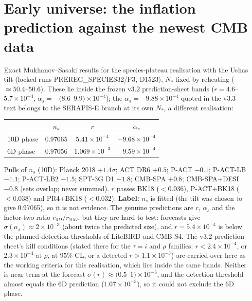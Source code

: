 \documentclass[11pt]{article}
\begin{document}
\section{Early universe: the inflation prediction against the newest CMB data}
Exact Mukhanov--Sasaki results for the species-plateau realisation with the Ushas tilt (locked runs PREREG\_SPECIES32/P3, D1523), $N_*$ fixed by reheating ($\simeq 50.4$--$50.6$). These lie inside the frozen v3.2 prediction-sheet bands ($r=4.6$--$5.7\times10^{-4}$, $\alpha_s=-(8.6$--$9.9)\times10^{-4}$); the $\alpha_s=-9.88\times10^{-4}$ quoted in the v3.3 text belongs to the SERAPIS-E branch at its own $N_*$, a different realisation:
\begin{center}\small
\begin{tabular}{lccc}\toprule
 & $n_s$ & $r$ & $\alpha_s$\\\midrule
10D phase & 0.97065 & $5.41\times10^{-4}$ & $-9.68\times10^{-4}$\\
6D phase & 0.97056 & $1.069\times10^{-3}$ & $-9.59\times10^{-4}$\\\bottomrule
\end{tabular}
\end{center}
Pulls of $n_s$ (10D): Planck 2018 $+1.4\sigma$; ACT DR6 $+0.5$; P-ACT $-0.1$; P-ACT-LB $-1.1$; P-ACT-LB2 $-1.5$; SPT-3G D1 $+1.8$; CMB-SPA $+0.8$; CMB-SPA+DESI $-0.8$ (sets overlap; never summed). $r$ passes BK18 ($<0.036$), P-ACT+BK18 ($<0.038$) and PR4+BK18 ($<0.032$). \textbf{Label:} $n_s$ is fitted (the tilt was chosen to give 0.97065), so it is not evidence. The genuine predictions are $r$, $\alpha_s$ and the factor-two ratio $r_{6D}/r_{10D}$, but they are hard to test: forecasts give $\sigma(\alpha_s)\approx2\times10^{-3}$ (about twice the predicted size), and $r=5.4\times10^{-4}$ is below the planned detection thresholds of LiteBIRD and CMB-S4. The v3.2 prediction sheet's kill conditions (stated there for the $\tau=i$ and $\rho$ families: $r<2.4\times10^{-4}$, or $2.3\times10^{-4}$ at $\rho$, at 95\% CL, or a detected $r>1.1\times10^{-3}$) are carried over here as the working criteria for this realisation, which lies inside the same bands. Neither is near-term at the forecast $\sigma(r)\approx(0.5$--$1)\times10^{-3}$, and the detection threshold almost equals the 6D prediction ($1.07\times10^{-3}$), so it could not exclude the 6D phase.
\end{document}

